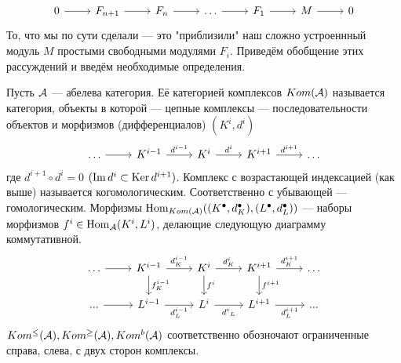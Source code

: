 \documentclass[../hw_main.tex]{subfiles}
\begin{document}
\begin{equation}\label{free_res_hilb}
    \begin{tikzcd}
	0 & {F_{n+1}} & {F_n} & \ldots & {F_1} & M & 0
	\arrow[from=1-1, to=1-2]
	\arrow[from=1-2, to=1-3]
	\arrow[from=1-3, to=1-4]
	\arrow[from=1-4, to=1-5]
	\arrow[from=1-5, to=1-6]
	\arrow[from=1-6, to=1-7]
\end{tikzcd}
\end{equation}
То, что мы по сути сделали --- это "приблизили" наш сложно устроеннный модуль $M$ простыми свободными модулями $F_i$.
Приведём обобщение этих рассуждений и введём необходимые определения.
\begin{to_def}\label{complex}
Пусть $\mathcal{A}$ --- абелева категория. Её категорией комплексов $Kom(\mathcal{A})$ называется категория, объекты в которой --- цепные комплексы --- последовательности объектов и морфизмов (дифференциалов) $(K^i, d^i)$
\begin{equation*}
    \begin{tikzcd}
	\ldots & {K^{i-1}} & {K^i} & {K^{i+1}} & \ldots
	\arrow[from=1-1, to=1-2]
	\arrow["{d^{i-1}}", from=1-2, to=1-3]
	\arrow["{d^i}", from=1-3, to=1-4]
	\arrow["{d^{i+1}}", from=1-4, to=1-5]
\end{tikzcd}
\end{equation*}
где $d^{i+1}\circ d^{i} = 0$ $(\mathop{\mathrm{Im}}\nolimits d^i \subset \mathop{\mathrm{Ker}}\nolimits d^{i+1})$. Комплекс с возрастающей индексацией (как выше) называется когомологическим. Соответственно с убывающей --- гомологическим. Морфизмы $\operatorname{Hom}_{Kom(\mathcal{A})}((K^\bullet, d^\bullet_K), (L^\bullet, d^\bullet_L))$ --- наборы морфизмов $f^i \in \operatorname{Hom}_{\mathcal{A}}(K^i, L^i)$, делающие следующую диаграмму коммутативной.
\begin{equation}\label{komplex_morphisms}
\begin{tikzcd}
	\ldots & {K^{i-1}} & {K^i} & {K^{i+1}} & \ldots \\
	{...} & {L^{i-1}} & {L^i} & {L^{i+1}} & {...}
	\arrow[from=1-1, to=1-2]
	\arrow["{d^{i-1}_K}", from=1-2, to=1-3]
	\arrow["{d^i_K}", from=1-3, to=1-4]
	\arrow["{d^{i+1}_K}", from=1-4, to=1-5]
	\arrow["{f^{i-1}_K}", from=1-2, to=2-2]
	\arrow[from=2-1, to=2-2]
	\arrow["{d^{i-1}_L}"', from=2-2, to=2-3]
	\arrow["{d^i}_L"', from=2-3, to=2-4]
	\arrow["{d^{i+1}_L}"', from=2-4, to=2-5]
	\arrow["{f^{i}}", from=1-3, to=2-3]
	\arrow["{f^{i+1}}", from=1-4, to=2-4]
\end{tikzcd}
\end{equation}
$Kom^\le(\mathcal{A}), Kom^\ge(\mathcal{A}), Kom^b(\mathcal{A})$ соответственно обозночают ограниченные справа, слева, с двух сторон комплексы.
\end{to_def}
\end{document}

